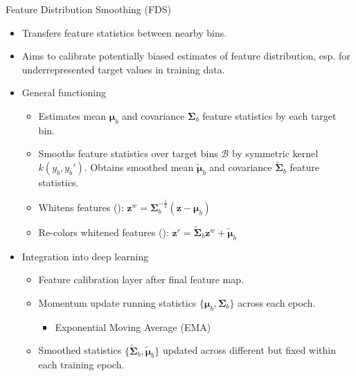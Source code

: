 \begin{frame}[shrink=4]{Feature Distribution Smoothing (FDS)}
	\begin{itemize}\setlength\itemsep{1.5em}
		\item<1-> Transfers feature statistics between nearby bins.
		\item<1-> Aims to calibrate potentially biased estimates of feature distribution, esp. for underrepresented target values in training data.
		\item<2-> General functioning
		\begin{itemize}
			\item Estimates mean $\bm{\mu}_b$ and covariance $\bm{\Sigma}_b$ feature statistics by each target bin.
			\item Smooths feature statistics over target bins $\mathcal{B}$ by symmetric kernel $k(y_b,y_b')$. Obtains smoothed mean $\tilde{\bm{\mu}}_b$ and covariance $\tilde{\bm{\Sigma}}_b$ feature statistics.
			\item Whitens features (\cite{sun2016return}): $\bm{z}^w = \bm{\Sigma}_b^{-\frac{1}{2}}(\bm{z} - \bm{\mu}_b)$
			\item Re-colors whitened features (\cite{sun2016return}): $\bm{z}^r = \tilde{\bm{\Sigma}}_b \bm{z}^w + \tilde{\bm{\mu}}_b$
		\end{itemize}
		\item<3-> Integration into deep learning
		\begin{itemize}
			\item Feature calibration layer after final feature map.
			\item Momentum update running statistics $\{\bm{\mu}_b,\bm{\Sigma}_b\}$ across each epoch. 
			\begin{itemize}
				\item Exponential Moving Average (EMA)
			\end{itemize}
			\item Smoothed statistics $\{\tilde{\bm{\Sigma}}_b,\tilde{\bm{\mu}}_b\}$ updated across different but fixed within each training epoch.
		\end{itemize}
	\end{itemize}
\end{frame}
